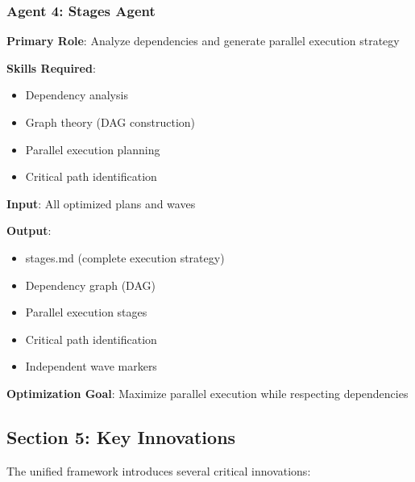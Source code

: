 \documentclass[12pt,letterpaper]{article}
\begin{document}
\subsubsection{Agent 4: Stages Agent}

\begin{tcolorbox}[colback=brown!5,colframe=brown,title=Stages Agent Specification]
\textbf{Primary Role}: Analyze dependencies and generate parallel execution strategy

\textbf{Skills Required}:
\begin{itemize}
    \item Dependency analysis
    \item Graph theory (DAG construction)
    \item Parallel execution planning
    \item Critical path identification
\end{itemize}

\textbf{Input}: All optimized plans and waves

\textbf{Output}:
\begin{itemize}
    \item stages.md (complete execution strategy)
    \item Dependency graph (DAG)
    \item Parallel execution stages
    \item Critical path identification
    \item Independent wave markers
\end{itemize}

\textbf{Optimization Goal}: Maximize parallel execution while respecting dependencies
\end{tcolorbox}

\subsection{Section 5: Key Innovations}

The unified framework introduces several critical innovations:
\end{document}
